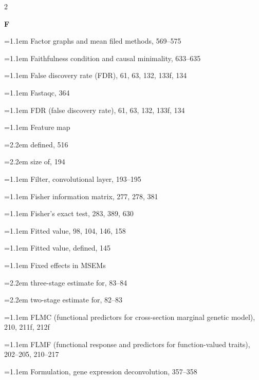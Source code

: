 \begin{multicols}{2}
\par{}\medskip\noindent\textbf{F}\par\nobreak\smallskip\nobreak
\noindent\hangindent=1.1em Factor graphs and mean filed methods, 569--575\par
\noindent\hangindent=1.1em Faithfulness condition and causal minimality, 633--635\par
\noindent\hangindent=1.1em False discovery rate (FDR), 61, 63, 132, 133f, 134\par
\noindent\hangindent=1.1em Fastaqc, 364\par
\noindent\hangindent=1.1em FDR (false discovery rate), 61, 63, 132, 133f, 134\par
\noindent\hangindent=1.1em Feature map\par
\noindent\hangindent=2.2em \hspace*{1.1em}defined, 516\par
\noindent\hangindent=2.2em \hspace*{1.1em}size of, 194\par
\noindent\hangindent=1.1em Filter, convolutional layer, 193--195\par
\noindent\hangindent=1.1em Fisher information matrix, 277, 278, 381\par
\noindent\hangindent=1.1em Fisher's exact test, 283, 389, 630\par
\noindent\hangindent=1.1em Fitted value, 98, 104, 146, 158\par
\noindent\hangindent=1.1em Fitted value, defined, 145\par
\noindent\hangindent=1.1em Fixed effects in MSEMs\par
\noindent\hangindent=2.2em \hspace*{1.1em}three-stage estimate for, 83--84\par
\noindent\hangindent=2.2em \hspace*{1.1em}two-stage estimate for, 82--83\par
\noindent\hangindent=1.1em FLMC (functional predictors for cross-section marginal genetic model), 210, 211f, 212f\par
\noindent\hangindent=1.1em FLMF (functional response and predictors for function-valued traits), 202--205, 210--217\par
\noindent\hangindent=1.1em Formulation, gene expression deconvolution, 357--358\par

\end{multicols}
